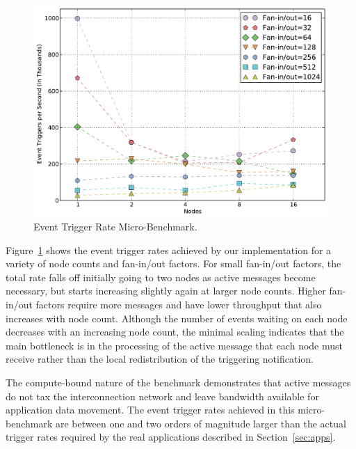 \begin{figure}
\begin{center}
\includegraphics[scale=0.33]{figs/event_throughput.pdf}
\end{center}
\vspace{-6mm}
\caption{Event Trigger Rate Micro-Benchmark.\label{fig:eventthroo}}
\vspace{-4mm}
\end{figure}

Figure~\ref{fig:eventthroo} shows the event trigger rates achieved by our implementation
for a variety of node counts and fan-in/out factors.
For small fan-in/out factors, the total rate falls off initially going to two nodes as active
messages become necessary, but starts increasing slightly again at larger node counts.  Higher
fan-in/out factors require more messages and have lower throughput that also increases with
node count.  Although the number of events waiting on each node decreases with an increasing
node count, the minimal scaling indicates that the main bottleneck is in the processing of the
active message that each node must receive rather than the local redistribution of the triggering
notification.

The compute-bound nature of the benchmark demonstrates that active messages do not tax 
the interconnection network and leave bandwidth available for application data movement.  
The event trigger rates achieved in this micro-benchmark are between one and two orders
of magnitude larger than the actual trigger rates required by the real applications
described in Section~\ref{sec:apps}.

